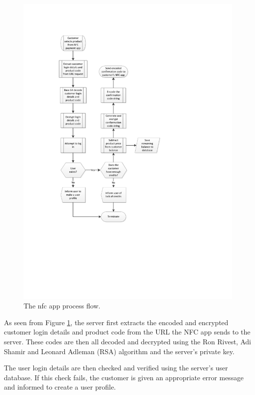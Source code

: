 \begin{figure}
 \centering 
 \includegraphics[clip=true, trim = 0 200 100 80,
 scale=0.7]{nfc_processflow_bak}
 \caption{The nfc app process flow.}
 \label{fig:nfc-process}
\end{figure}

As seen from Figure \ref{fig:nfc-process}, the server first extracts the encoded and encrypted
customer login details and product code from the URL the NFC app sends to the server. These
codes are then all decoded and decrypted using the Ron Rivest, Adi Shamir and Leonard Adleman
(RSA) algorithm and the server's private key. 

The user login details are then checked and verified using the server's user database. If this
check fails, the customer is given an appropriate error message and informed to create a user
profile. 

